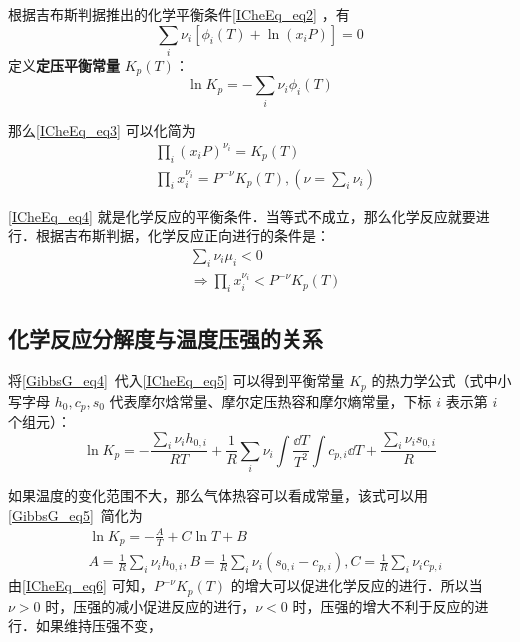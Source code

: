 根据吉布斯判据推出的化学平衡条件\autoref{ICheEq_eq2} ，有
\begin{equation}\label{ICheEq_eq3}
\sum_i\nu_i[\phi_i(T)+\ln (x_iP)]=0
\end{equation}
定义\textbf{定压平衡常量} $K_p(T)$：
\begin{equation}\label{ICheEq_eq5}
\ln K_p=-\sum_i\nu_i\phi_i(T)
\end{equation}

那么\autoref{ICheEq_eq3} 可以化简为
\begin{equation}\label{ICheEq_eq4}
\begin{aligned}
&\prod_i (x_iP)^{\nu_i}=K_p(T)\\
&\prod_i x_i^{\nu_i}=P^{-\nu} K_p(T),(\nu=\sum_i\nu_i)
\end{aligned}
\end{equation}

\autoref{ICheEq_eq4} 就是化学反应的平衡条件．当等式不成立，那么化学反应就要进行．根据吉布斯判据，化学反应正向进行的条件是：
\begin{equation}\label{ICheEq_eq6}
\begin{aligned}
&\sum_i \nu_i\mu_i<0\\
&\Rightarrow \prod_i x_i^{\nu_i}<P^{-\nu}K_p(T)
\end{aligned}
\end{equation}


\subsection{化学反应分解度与温度压强的关系}
将\autoref{GibbsG_eq4}~代入\autoref{ICheEq_eq5} 可以得到平衡常量 $K_p$ 的热力学公式（式中小写字母 $h_0,c_p,s_0$ 代表摩尔焓常量、摩尔定压热容和摩尔熵常量，下标 $i$ 表示第 $i$ 个组元）：
\begin{equation}
\ln K_p=-\frac{\sum_i \nu_i h_{0,i}}{RT}+\frac{1}{R}\sum_i\nu_i\int \frac{\dd T}{T^2}\int c_{p,i}\dd T + \frac{\sum_i \nu_i s_{0,i}}{R}
\end{equation}

如果温度的变化范围不大，那么气体热容可以看成常量，该式可以用\autoref{GibbsG_eq5}~简化为
\begin{equation}
\begin{aligned}
&\ln K_p=-\frac{A}{T}+C\ln T+B\\
&A=\frac{1}{R} \sum_i \nu_i h_{0,i},B=\frac{1}{R}\sum_i \nu_i(s_{0,i}-c_{p,i}),C=\frac{1}{R}\sum_i \nu_ic_{p,i}
\end{aligned}
\end{equation}
由\autoref{ICheEq_eq6} 可知，$P^{-\nu}K_p(T)$ 的增大可以促进化学反应的进行．所以当 $\nu>0$ 时，压强的减小促进反应的进行，$\nu<0$ 时，压强的增大不利于反应的进行．如果维持压强不变，